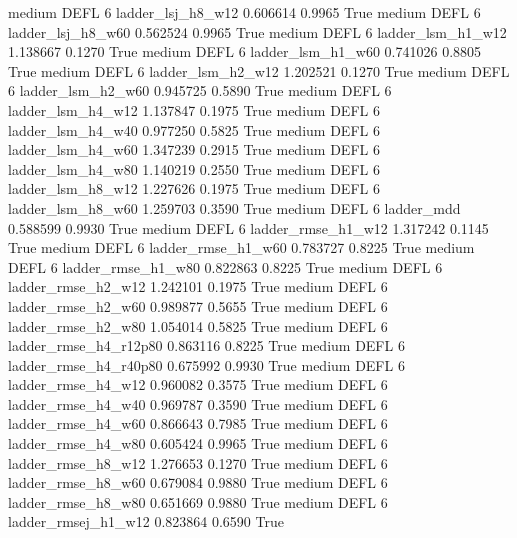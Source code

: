     medium     DEFL                 6      ladder_lsj_h8_w12   0.606614      0.9965    True
    medium     DEFL                 6      ladder_lsj_h8_w60   0.562524      0.9965    True
    medium     DEFL                 6      ladder_lsm_h1_w12   1.138667      0.1270    True
    medium     DEFL                 6      ladder_lsm_h1_w60   0.741026      0.8805    True
    medium     DEFL                 6      ladder_lsm_h2_w12   1.202521      0.1270    True
    medium     DEFL                 6      ladder_lsm_h2_w60   0.945725      0.5890    True
    medium     DEFL                 6      ladder_lsm_h4_w12   1.137847      0.1975    True
    medium     DEFL                 6      ladder_lsm_h4_w40   0.977250      0.5825    True
    medium     DEFL                 6      ladder_lsm_h4_w60   1.347239      0.2915    True
    medium     DEFL                 6      ladder_lsm_h4_w80   1.140219      0.2550    True
    medium     DEFL                 6      ladder_lsm_h8_w12   1.227626      0.1975    True
    medium     DEFL                 6      ladder_lsm_h8_w60   1.259703      0.3590    True
    medium     DEFL                 6             ladder_mdd   0.588599      0.9930    True
    medium     DEFL                 6     ladder_rmse_h1_w12   1.317242      0.1145    True
    medium     DEFL                 6     ladder_rmse_h1_w60   0.783727      0.8225    True
    medium     DEFL                 6     ladder_rmse_h1_w80   0.822863      0.8225    True
    medium     DEFL                 6     ladder_rmse_h2_w12   1.242101      0.1975    True
    medium     DEFL                 6     ladder_rmse_h2_w60   0.989877      0.5655    True
    medium     DEFL                 6     ladder_rmse_h2_w80   1.054014      0.5825    True
    medium     DEFL                 6  ladder_rmse_h4_r12p80   0.863116      0.8225    True
    medium     DEFL                 6  ladder_rmse_h4_r40p80   0.675992      0.9930    True
    medium     DEFL                 6     ladder_rmse_h4_w12   0.960082      0.3575    True
    medium     DEFL                 6     ladder_rmse_h4_w40   0.969787      0.3590    True
    medium     DEFL                 6     ladder_rmse_h4_w60   0.866643      0.7985    True
    medium     DEFL                 6     ladder_rmse_h4_w80   0.605424      0.9965    True
    medium     DEFL                 6     ladder_rmse_h8_w12   1.276653      0.1270    True
    medium     DEFL                 6     ladder_rmse_h8_w60   0.679084      0.9880    True
    medium     DEFL                 6     ladder_rmse_h8_w80   0.651669      0.9880    True
    medium     DEFL                 6    ladder_rmsej_h1_w12   0.823864      0.6590    True
